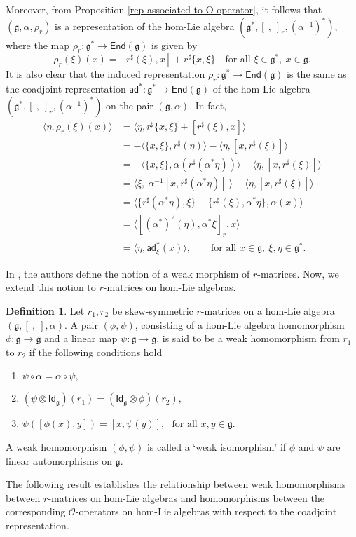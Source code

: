 \documentclass[a4paper,11pt]{amsart}
\theoremstyle{plain}
\theoremstyle{definition}
\newtheorem{definition}[theorem]{Definition}
\theoremstyle{remark}
\numberwithin{equation}{section}
\begin{document}
Moreover, from Proposition \ref{rep associated to O-operator}, it follows that $(\mathfrak{g},\alpha,\rho_{r})$ is a representation of the hom-Lie algebra $(\mathfrak{g}^*,[~,~]_r,(\alpha^{-1})^*)$, where the map $\rho_{r}:\mathfrak{g}^*\rightarrow\mathsf{End}(\mathfrak{g})$ is given by 
$$\rho_{r}(\xi)(x)=[r^{\sharp}(\xi),x]+r^{\sharp} \{x,\xi\}\quad\mbox{for all }\xi\in \mathfrak{g}^*,~x\in \mathfrak{g}.$$
It is also clear that the induced representation $\rho_r:\mathfrak{g}^*\rightarrow \mathsf{End}(\mathfrak{g})$ is the same as the coadjoint representation $\mathsf{ad}^*:\mathfrak{g}^*\rightarrow \mathsf{End}(\mathfrak{g})$ of the hom-Lie algebra $(\mathfrak{g}^*,[~,~]_r,(\alpha^{-1})^*)$ on the pair $(\mathfrak{g},\alpha)$. In fact,  
\begin{align*}
\langle\eta, \rho_r(\xi)(x)\rangle&=\langle\eta, r^{\sharp} \{x,\xi\}+[r^{\sharp}(\xi),x]\rangle\\&=-\langle \{x,\xi\},r^{\sharp}(\eta)\rangle - \langle\eta, [x,r^{\sharp}(\xi)]\rangle\\
&=-\langle\{x,\xi\},\alpha(r^{\sharp}(\alpha^*\eta))\rangle- \langle\eta,[x,r^{\sharp}(\xi)]\rangle\\
&=\big\langle\xi,~\alpha^{-1}[x,r^{\sharp}(\alpha^*\eta)]~\big\rangle- \langle\eta, [x,r^{\sharp}(\xi)]\rangle\\
&=\langle \{r^{\sharp}(\alpha^*\eta),\xi\}-\{r^{\sharp}(\xi),\alpha^*\eta\},\alpha(x)\rangle\\
&=\langle [(\alpha^*)^2(\eta),\alpha^*\xi]_r,x\rangle\\
&=\langle \eta,\mathsf{ad}^*_{\xi}(x)\rangle, \quad \quad \mbox{for all } x\in \mathfrak{g},~\xi,\eta\in \mathfrak{g}^*.
\end{align*}

In \cite{Sheng3}, the authors define the notion of a weak morphism of $r$-matrices. Now, we extend this notion to $r$-matrices on hom-Lie algebras.      

\begin{definition}
Let $r_1,r_2$ be skew-symmetric $r$-matrices on a hom-Lie algebra $(\mathfrak{g},[~,~],\alpha)$. A pair $(\phi,\psi)$, consisting of a hom-Lie algebra homomorphism $\phi:\mathfrak{g}\rightarrow \mathfrak{g}$ and a linear map $\psi:\mathfrak{g}\rightarrow \mathfrak{g}$, is said to be a weak homomorphism from $r_1$ to $r_2$ if the following conditions hold
\begin{enumerate}[label=\alph*)]
\item $\psi\circ \alpha=\alpha\circ \psi,$
\item $(\psi\otimes \mathsf{Id}_{\mathfrak{g}})(r_1)=(\mathsf{Id}_{\mathfrak{g}}\otimes \phi)(r_2),$
\item $\psi([\phi(x),y])=[x,\psi(y)],~~~\mbox{for all }x,y\in \mathfrak{g}$.
\end{enumerate} 
A weak homomorphism $(\phi,\psi)$ is called a `weak isomorphism' if $\phi$ and $\psi$ are linear automorphisms on $\mathfrak{g}$. 
\end{definition}
The following result establishes the relationship between weak homomorphisms between $r$-matrices on hom-Lie algebras and homomorphisms between the corresponding $\mathcal{O}$-operators on hom-Lie algebras with respect to the coadjoint representation.
\end{document}
